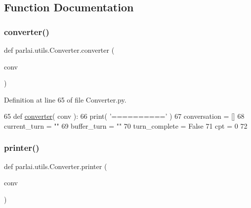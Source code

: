 \subsection{Function Documentation}
\mbox{\label{namespaceparlai_1_1utils_1_1Converter_abd079f987382596057ec8c630fa3db8c}} 
\subsubsection{\texorpdfstring{converter()}{converter()}}
{\footnotesize\ttfamily def parlai.\+utils.\+Converter.\+converter (\begin{DoxyParamCaption}\item[{}]{conv }\end{DoxyParamCaption})}



Definition at line 65 of file Converter.\+py.


\begin{DoxyCode}
65 \textcolor{keyword}{def }\hyperlink{namespaceparlai_1_1utils_1_1Converter_abd079f987382596057ec8c630fa3db8c}{converter}( conv ):
66     print( \textcolor{stringliteral}{'=========='} )
67     conversation = []
68     current\_turn = \textcolor{stringliteral}{""}
69     buffer\_turn = \textcolor{stringliteral}{""}
70     turn\_complete = \textcolor{keyword}{False}
71     cpt = 0
72 
\end{DoxyCode}
\mbox{\label{namespaceparlai_1_1utils_1_1Converter_a2ef9c241b22f84ea3a4123efd90f29b6}} 
\subsubsection{\texorpdfstring{printer()}{printer()}}
{\footnotesize\ttfamily def parlai.\+utils.\+Converter.\+printer (\begin{DoxyParamCaption}\item[{}]{conv }\end{DoxyParamCaption})}



